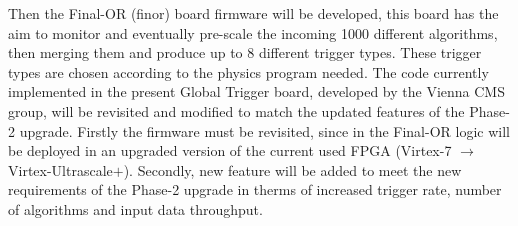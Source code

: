 \documentclass[../../main/main.tex]{subfiles}
\begin{document}
    Then the Final-OR (finor) board firmware will be developed, this board has the aim to monitor and eventually pre-scale the incoming 1000 different algorithms, then merging them and produce up to 8 different trigger types. These trigger types are chosen according to the physics program needed.  
    The code currently implemented in the present Global Trigger board, developed by the Vienna CMS group, will be revisited and modified to match the updated features of the Phase-2 upgrade. Firstly the firmware must be revisited, since in the Final-OR logic will be deployed in an upgraded version of the current used FPGA (Virtex-7 $\to$ Virtex-Ultrascale$+$). 
    Secondly, new feature will be added to meet the new requirements of the Phase-2 upgrade in therms of increased trigger rate, number of algorithms and input data throughput. 
    
    
\end{document}
